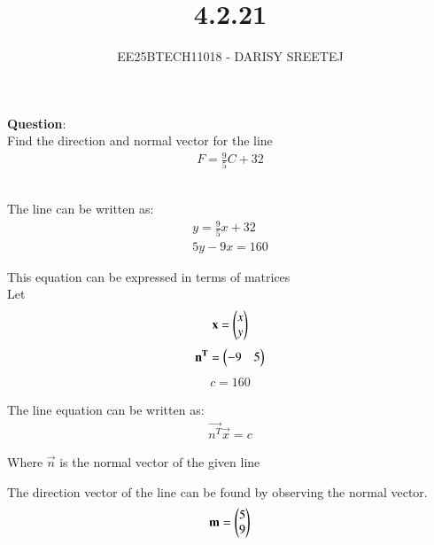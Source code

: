 \documentclass[journal]{IEEEtran}
\begin{document}

\vspace{3cm}

\title{4.2.21}
\author{EE25BTECH11018 - DARISY SREETEJ}
{\let\newpage\relax\maketitle}

\renewcommand{\thefigure}{\theenumi}
\renewcommand{\thetable}{\theenumi}
\setlength{\intextsep}{10pt} %


\renewcommand{\thetable}{\theenumi}

\textbf{Question}:\\
Find the direction and normal vector for the line 
\begin{align}
F = \frac{9}{5} C + 32
\end{align}

\solution\\
The line can be written as: 
\begin{align}
y = \frac{9}{5}x+32\\
5y - 9x = 160
\end{align}

This equation can be expressed in terms of matrices\\
Let
\begin{align}
\mathbf{x} = \begin{pmatrix}x \\ y\end{pmatrix}
\end{align}
\begin{align}
\mathbf{n^T} = \begin{pmatrix}-9 & 5\end{pmatrix}
\end{align}
\begin{align}
c = 160
\end{align}

The line equation can be written as:
\begin{align}
\vec{n^T}  \vec{x} = c
\end{align}

Where $\vec{n}$ is the normal vector of the given line

The direction vector of the line can be found by observing the normal vector.
\begin{align}
\mathbf{m} = \begin{pmatrix}5 \\ 9\end{pmatrix}
\end{align}
\end{document}
